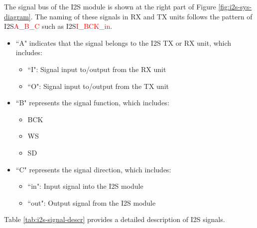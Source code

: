 \documentclass[main\_\_EN.tex]{subfiles}
\begin{document}
The signal bus of the I2S module is shown at the right part of Figure \ref{fig:i2s-sys-diagram}. The naming of these signals in RX and TX units follows the pattern of I2S\textcolor{red}{A}\_\textcolor{red}{B}\_\textcolor{red}{C} such as I2S\textcolor{red}{I}\_\textcolor{red}{BCK}\_\textcolor{red}{in}.

\begin{itemize}
    \item ``A" indicates that the signal belongs to the I2S TX or RX unit, which includes:
    \begin{itemize}
        \item ``I": Signal input to/output from the RX unit
        \item ``O": Signal input to/output from the TX unit
    \end{itemize}
    \item ``B" represents the signal function, which includes:
    \begin{itemize}
        \item BCK
        \item WS
        \item SD
    \end{itemize}
    \item ``C" represents the signal direction, which includes:
    \begin{itemize}
        \item ``in": Input signal into the I2S module
        \item ``out": Output signal from the I2S module
    \end{itemize}
\end{itemize}

Table \ref{tab:i2s-signal-descr} provides a detailed description of I2S signals.
\end{document}
